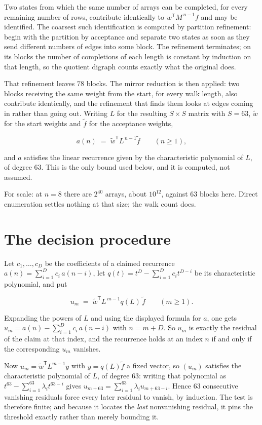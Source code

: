 \documentclass[11pt]{article}
\theoremstyle{definition}
\begin{document}
Two states from which the same number of arrays can be completed, for every remaining number of rows, contribute identically to $w^{\mathsf T}M^{\,n-1}f$ and may be identified. The coarsest such identification is computed by partition refinement: begin with the partition by acceptance and separate two states as soon as they send different numbers of edges into some block. The refinement terminates; on its blocks the number of completions of each length is constant by induction on that length, so the quotient digraph counts exactly what the original does.

That refinement leaves $78$ blocks. The mirror reduction is then applied: two blocks receiving the same weight from the start, for every walk length, also contribute identically, and the refinement that finds them looks at edges coming in rather than going out. Writing $L$ for the resulting $S \times S$ matrix with $S = 63$, $\tilde w$ for the start weights and $\tilde f$ for the acceptance weights,

\[a(n) \;=\; \tilde w^{\mathsf T} L^{\,n-1} \tilde f \qquad (n \ge 1),\]

and $a$ satisfies the linear recurrence given by the characteristic polynomial of $L$, of degree $63$. This is the only bound used below, and it is computed, not assumed.

For scale: at $n = 8$ there are $2^{40}$ arrays, about $10^{12}$, against $63$ blocks here. Direct enumeration settles nothing at that size; the walk count does.

\section{The decision procedure}

Let $c_1,\dots,c_D$ be the coefficients of a claimed recurrence $a(n) = \sum_{i=1}^{D} c_i\,a(n-i)$, let $q(t) = t^{D} - \sum_{i=1}^{D} c_i t^{D-i}$ be its characteristic polynomial, and put

\[u_m \;=\; \tilde w^{\mathsf T} L^{\,m-1} q(L)\,\tilde f \qquad (m \ge 1).\]

Expanding the powers of $L$ and using the displayed formula for $a$, one gets $u_m = a(n) - \sum_{i=1}^{D} c_i\,a(n-i)$ with $n = m + D$. So $u_m$ is exactly the residual of the claim at that index, and the recurrence holds at an index $n$ if and only if the corresponding $u_m$ vanishes.

Now $u_m = \tilde w^{\mathsf T} L^{m-1} y$ with $y = q(L)\tilde f$ a fixed vector, so $(u_m)$ satisfies the characteristic polynomial of $L$, of degree $63$: writing that polynomial as $t^{63} - \sum_{i=1}^{63} \lambda_i t^{63-i}$ gives $u_{m+63} = \sum_{i=1}^{63} \lambda_i u_{m+63-i}$. Hence $63$ consecutive vanishing residuals force every later residual to vanish, by induction. The test is therefore finite; and because it locates the {\itshape last} nonvanishing residual, it pins the threshold exactly rather than merely bounding it.
\end{document}
